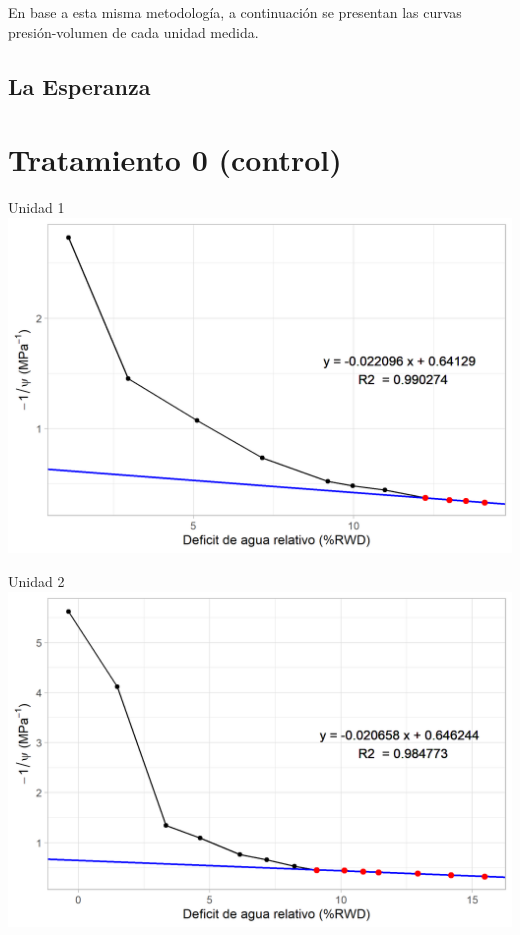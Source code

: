 \documentclass[
  letterpaper,
  DIV=11,
  numbers=noendperiod]{scrreprt}
\begin{document}
En base a esta misma metodología, a continuación se presentan las curvas
presión-volumen de cada unidad medida.

\section{La Esperanza}\label{la-esperanza}

\chapter{Tratamiento 0 (control)}

Unidad 1 \includegraphics{figuras/06_tlp/tlp_la_esperanza_T0_1.png}

Unidad 2 \includegraphics{figuras/06_tlp/tlp_la_esperanza_T0_2.png}
\end{document}
